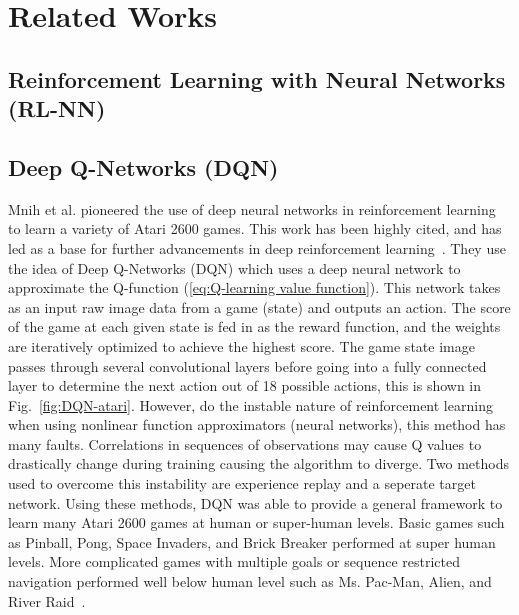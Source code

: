 \documentclass[12pt,american]{report}
\providecommand{\DIFaddbegin}{} %
\providecommand{\DIFaddend}{} %
\providecommand{\DIFdelbegin}{} %
\providecommand{\DIFdelend}{} %
\newcommand{\DIFscaledelfig}{0.5}
\newlength{\DIFdelgraphicswidth} %
\newlength{\DIFdelgraphicsheight} %
\newcommand{\DIFaddincludegraphics}[2][]{{\color{blue}\fbox{\DIFOincludegraphics[#1]{#2}}}} %
\newcommand{\DIFdelincludegraphics}[2][]{%
\sbox{\DIFdelgraphicsbox}{\DIFOincludegraphics[#1]{#2}}%
\settoboxwidth{\DIFdelgraphicswidth}{\DIFdelgraphicsbox} %
\settoboxtotalheight{\DIFdelgraphicsheight}{\DIFdelgraphicsbox} %
\scalebox{\DIFscaledelfig}{%
\parbox[b]{\DIFdelgraphicswidth}{\usebox{\DIFdelgraphicsbox}\\[-\baselineskip] \rule{\DIFdelgraphicswidth}{0em}}\llap{\resizebox{\DIFdelgraphicswidth}{\DIFdelgraphicsheight}{%
\setlength{\unitlength}{\DIFdelgraphicswidth}%
\begin{picture}(1,1)%
\thicklines\linethickness{2pt} %
{\color[rgb]{1,0,0}\put(0,0){\framebox(1,1){}}}%
{\color[rgb]{1,0,0}\put(0,0){\line( 1,1){1}}}%
{\color[rgb]{1,0,0}\put(0,1){\line(1,-1){1}}}%
\end{picture}%
}\hspace*{3pt}}} %
} %
\DeclareRobustCommand{\DIFaddbegin}{\DIFOaddbegin \let\includegraphics\DIFaddincludegraphics} %
\DeclareRobustCommand{\DIFaddend}{\DIFOaddend \let\includegraphics\DIFOincludegraphics} %
\DeclareRobustCommand{\DIFdelbegin}{\DIFOdelbegin \let\includegraphics\DIFdelincludegraphics} %
\DeclareRobustCommand{\DIFdelend}{\DIFOaddend \let\includegraphics\DIFOincludegraphics} %
\begin{document}
\section{Related Works}

\subsection{Reinforcement Learning with Neural Networks (RL-NN)}

\subsection{Deep Q-Networks (DQN)}
\DIFdelbegin %

\DIFdelend \DIFaddbegin \label{sec:dqn}
\DIFaddend Mnih et al. pioneered the use of deep neural networks in reinforcement learning to learn a variety of Atari 2600 games.  This work has been highly cited, and has led as a base for further advancements in deep reinforcement learning~\cite{atari}.  They use the idea of Deep Q-Networks (DQN) which uses a deep neural network to approximate the Q-function (\ref{eq:Q-learning value function}). This network takes as an input raw image data from a game (state) and outputs an action. The score of the game at each given state is fed in as the reward function, and the weights are iteratively optimized to achieve the highest score. The game state image passes through several convolutional layers before going into a fully connected layer to determine the next action out of 18 possible actions, this is shown in Fig.~\ref{fig:DQN-atari}. However, do the instable nature of reinforcement learning when using nonlinear function approximators (neural networks), this method has many faults. Correlations in sequences of observations may cause Q values to drastically change during training causing the algorithm to diverge. Two methods used to overcome this instability are experience replay and a seperate target network. Using these methods, DQN was able to provide a general framework to learn many Atari 2600 games at human or super-human levels. Basic games such as Pinball, Pong, Space Invaders, and Brick Breaker performed at super human levels. More complicated games with multiple goals or sequence restricted navigation performed well below human level such as Ms. Pac-Man, Alien, and River Raid~\cite{atari}.
\end{document}
